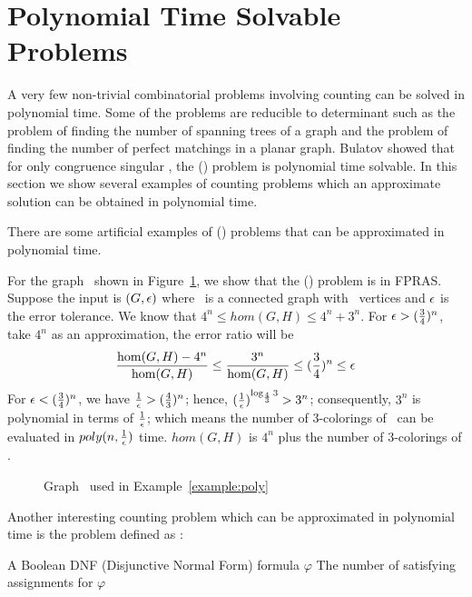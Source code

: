 \section{Polynomial Time Solvable Problems}
A very few non-trivial combinatorial problems involving counting 
can be solved in polynomial time.
Some of the problems are reducible to determinant such as
the problem of finding the number of spanning trees of a graph and 
the problem of finding the number of perfect matchings in a planar graph.
Bulatov \cite{Bulatov} showed that for only congruence singular \mrelset, the \ccsp(\mrelset)
problem  is polynomial time solvable. In this section we show several
examples of counting problems which an approximate solution can be obtained in polynomial time.

There are some artificial examples of \ccsp(\mrelset) problems that can be approximated 
in polynomial time. 

\begin{example} \label{example:poly}
For the graph \mH\ shown in Figure~\ref{fig:approxible},
we show that the \chom(\mH) problem is in FPRAS\@. Suppose the input is 
\((G,\epsilon)\) where \mG\ is a connected graph with \mn\ vertices and \(\epsilon\)
is the error tolerance.
We know that 
\(4^n\le hom(G,H) \le 4^n+3^n\)\@.
For \(\epsilon > (\frac{3}{4})^n\), take \(4^n\) as an approximation, the error ratio will  be
\[\frac{\hom(G,H)-4^n}{\hom(G,H)} \le \frac{3^n}{\hom(G,H)} \le (\frac{3}{4})^n \le \epsilon\]
For \(\epsilon < (\frac{3}{4})^n\), we have \(\frac{1}{\epsilon}>(\frac{4}{3})^n \);
hence, \((\frac{1}{\epsilon})^{\log_{\frac{4}{3}}3} > 3^n\); consequently, \(3^n\) is polynomial 
in terms of \(\frac{1}{\epsilon}\); which means the number of 3-colorings of \mG\ can be evaluated in 
\(poly(n,\frac{1}{\epsilon})\) time. 
\(hom(G,H)\) is \(4^n\) plus the number of 3-colorings of \mG\@.

\begin{figure}[h]
\center
\caption{Graph \mG\ used in Example~\ref{example:poly}}
\label{fig:approxible}
\end{figure}
\end{example}

Another interesting counting problem which can be approximated in polynomial time is 
the  problem defined as :

\pnndef %
{A Boolean DNF (Disjunctive Normal Form) formula \(\varphi\)}
{The number of satisfying assignments for \(\varphi\)}

